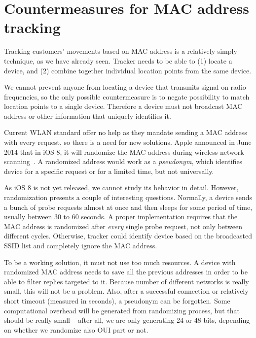 \documentclass[12pt,a4paper,oneside,pdftex]{report}
\begin{document}
\section{Countermeasures for MAC address tracking}

Tracking customers' movements based on MAC address is a relatively simply technique, as we have already seen. Tracker needs to be able to (1) locate a device, and (2) combine together individual location points from the same device.

We cannot prevent anyone from locating a device that transmits signal on radio frequencies, so the only possible countermeasure is to negate possibility to match location points to a single device. Therefore a device must not broadcast MAC address or other information that uniquely identifies it.

Current WLAN standard offer no help as they mandate sending a MAC address with every request, so there is a need for new solutions. Apple announced in June 2014 that in iOS 8, it will randomize the MAC address during wireless network scanning~\cite{FredericJacobs2014,apple_wwdc_privacy}. A randomized address would work as a \emph{pseudonym}, which identifies device for a specific request or for a limited time, but not universally.

As iOS 8 is not yet released, we cannot study its behavior in detail. However, randomization presents a couple of interesting questions. Normally, a device sends a bunch of probe requests almost at once and then sleeps for some period of time, usually between 30 to 60 seconds. A proper implementation requires that the MAC address is randomized after \emph{every} single probe request, not only between different cycles. Otherwise, tracker could identify device based on the broadcasted SSID list and completely ignore the MAC address.

To be a working solution, it must not use too much resources. A device with randomized MAC address needs to save all the previous addresses in order to be able to filter replies targeted to it. Because number of different networks is really small, this will not be a problem. Also, after a successful connection or relatively short timeout (measured in seconds), a pseudonym can be forgotten. Some computational overhead will be generated from randomizing process, but that should be really small -- after all, we are only generating 24 or 48 bits, depending on whether we randomize also OUI part or not.
\end{document}
